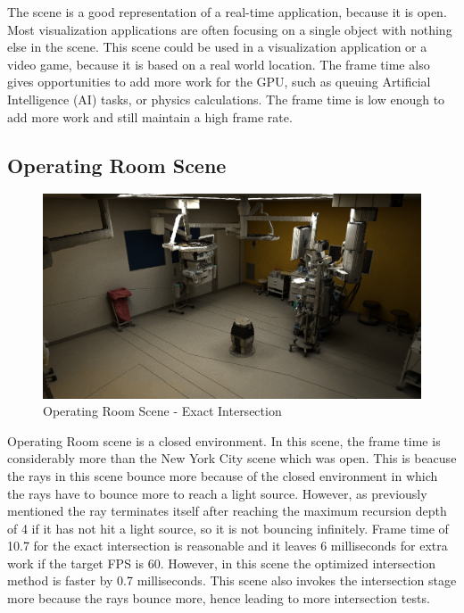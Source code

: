 \documentclass[12pt]{article}
\begin{document}
The scene is a good representation of a real-time application, because it is open.
Most visualization applications are often focusing on a single object with nothing else in the scene.
This scene could be used in a visualization application or a video game, because it is based on a real world location.
The frame time also gives opportunities to add more work for the GPU, such as queuing Artificial Intelligence (AI) tasks,
or physics calculations. The frame time is low enough to add more work and still maintain a high frame rate.

\subsection{Operating Room Scene}

\begin{figure}[H]
    \begin{center}
        \includegraphics[scale=0.25]{OperationRoom}
    \end{center}
    \caption{Operating Room Scene - Exact Intersection}
    \label{fig:OperationRoom}
\end{figure}

Operating Room scene is a closed environment. In this scene, the frame time is considerably more than the New York City scene
which was open. This is beacuse the rays in this scene bounce more because of the closed environment
in which the rays have to bounce more to reach a light source. However, as previously mentioned
the ray terminates itself after reaching the maximum recursion depth of 4 if it has not
hit a light source, so it is not bouncing infinitely. Frame time of 10.7 for the exact intersection is reasonable and it
leaves 6 milliseconds for extra work if the target FPS is 60. However, in this scene the optimized
intersection method is faster by 0.7 milliseconds. This scene also invokes the intersection stage
more because the rays bounce more, hence leading to more intersection tests.
\end{document}
